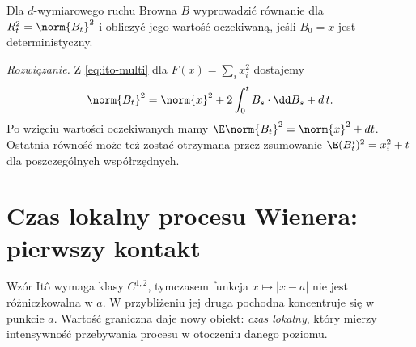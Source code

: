 \begin{zadanie}
Dla $d$-wymiarowego ruchu Browna $B$ wyprowadzić
równanie dla $R_t^2=\norm{B_t}^2$ i obliczyć jego
wartość oczekiwaną, jeśli $B_0=x$ jest deterministyczny.

\emph{Rozwiązanie.} Z \eqref{eq:ito-multi} dla
$F(x)=\sum_i x_i^2$ dostajemy
\[
\norm{B_t}^2=\norm{x}^2+2\int_0^t B_s\cdot\dd B_s+d\,t.
\]
Po wzięciu wartości oczekiwanych mamy
$\E\norm{B_t}^2=\norm{x}^2+dt$. Ostatnia równość
może też zostać otrzymana przez zsumowanie
$\E(B_t^i)^2=x_i^2+t$ dla poszczególnych współrzędnych.
\end{zadanie}

\section{Czas lokalny procesu Wienera: pierwszy kontakt}
Wzór Itô wymaga klasy $C^{1,2}$, tymczasem
funkcja $x\mapsto|x-a|$ nie jest różniczkowalna w $a$.
W przybliżeniu jej druga pochodna koncentruje się
w punkcie $a$. Wartość graniczna daje nowy obiekt:
\emph{czas lokalny}, który mierzy intensywność
przebywania procesu w otoczeniu danego poziomu.

